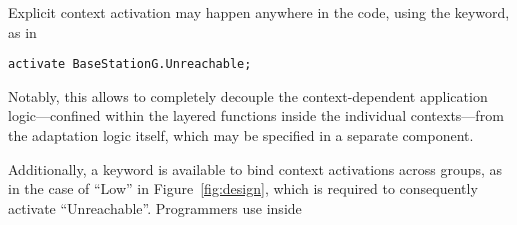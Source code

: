 Explicit context activation may happen anywhere in the code, using the
 keyword, as in
\begin{lstlisting}[language=conesc]
activate BaseStationG.Unreachable;
\end{lstlisting}
Notably, this allows to completely decouple the context-dependent
application logic---confined within the layered functions inside the
individual contexts---from the adaptation logic itself, which may be
specified in a separate component. 

Additionally, a keyword  is available to bind
context activations across groups, as in the case of ``Low'' in
Figure~\ref{fig:design}, which is required to consequently activate
``Unreachable''. Programmers use  inside 

